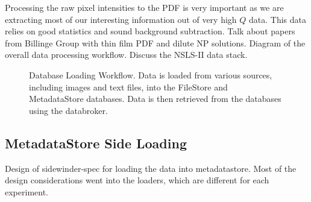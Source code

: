 Processing the raw pixel intensities to the PDF is very important as we are extracting most of our interesting information out of very high $Q$ data.
This data relies on good statistics and sound background subtraction.
Talk about papers from Billinge Group with thin film PDF and dilute NP solutions.
Diagram of the overall data processing workflow.
Discuss the NSLS-II data stack.
\begin{figure}
\centering
{}
\caption{Database Loading Workflow. Data is loaded from various sources, including images and text files, into the FileStore and MetadataStore databases. Data is then retrieved from the databases using the databroker.}
\end{figure}
\subsection{MetadataStore Side Loading}
Design of sidewinder-spec for loading the data into metadatastore.
Most of the design considerations went into the loaders, which are different for each experiment.






